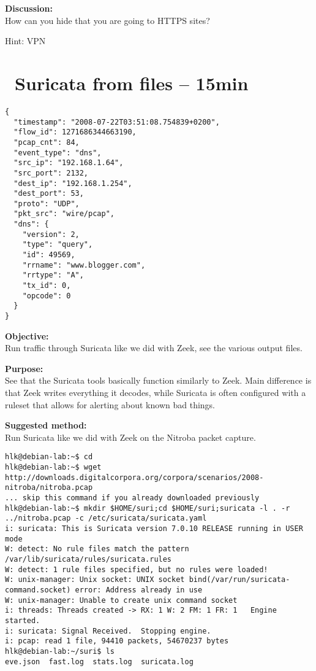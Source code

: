 \documentclass[a4paper,11pt,notitlepage]{report}
\begin{document}
{\bf Discussion:}\\
How can you hide that you are going to HTTPS sites?

Hint: VPN



\chapter{\faExclamationTriangle\ Suricata from files -- 15min}
\label{ex:suricata-read}

\begin{verbatim}
{
  "timestamp": "2008-07-22T03:51:08.754839+0200",
  "flow_id": 1271686344663190,
  "pcap_cnt": 84,
  "event_type": "dns",
  "src_ip": "192.168.1.64",
  "src_port": 2132,
  "dest_ip": "192.168.1.254",
  "dest_port": 53,
  "proto": "UDP",
  "pkt_src": "wire/pcap",
  "dns": {
    "version": 2,
    "type": "query",
    "id": 49569,
    "rrname": "www.blogger.com",
    "rrtype": "A",
    "tx_id": 0,
    "opcode": 0
  }
}
\end{verbatim}

{\bf Objective:} \\
Run traffic through Suricata like we did with Zeek, see the various output files.


{\bf Purpose:}\\
See that the Suricata tools basically function similarly to Zeek. Main difference is that Zeek writes everything it decodes, while Suricata is often configured with a ruleset that allows for alerting about known bad things.

{\bf Suggested method:}\\
Run Suricata like we did with Zeek on the Nitroba packet capture.
\begin{verbatim}
hlk@debian-lab:~$ cd
hlk@debian-lab:~$ wget http://downloads.digitalcorpora.org/corpora/scenarios/2008-nitroba/nitroba.pcap
... skip this command if you already downloaded previously
hlk@debian-lab:~$ mkdir $HOME/suri;cd $HOME/suri;suricata -l . -r ../nitroba.pcap -c /etc/suricata/suricata.yaml
i: suricata: This is Suricata version 7.0.10 RELEASE running in USER mode
W: detect: No rule files match the pattern /var/lib/suricata/rules/suricata.rules
W: detect: 1 rule files specified, but no rules were loaded!
W: unix-manager: Unix socket: UNIX socket bind(/var/run/suricata-command.socket) error: Address already in use
W: unix-manager: Unable to create unix command socket
i: threads: Threads created -> RX: 1 W: 2 FM: 1 FR: 1   Engine started.
i: suricata: Signal Received.  Stopping engine.
i: pcap: read 1 file, 94410 packets, 54670237 bytes
hlk@debian-lab:~/suri$ ls
eve.json  fast.log  stats.log  suricata.log
\end{verbatim}
\end{document}

